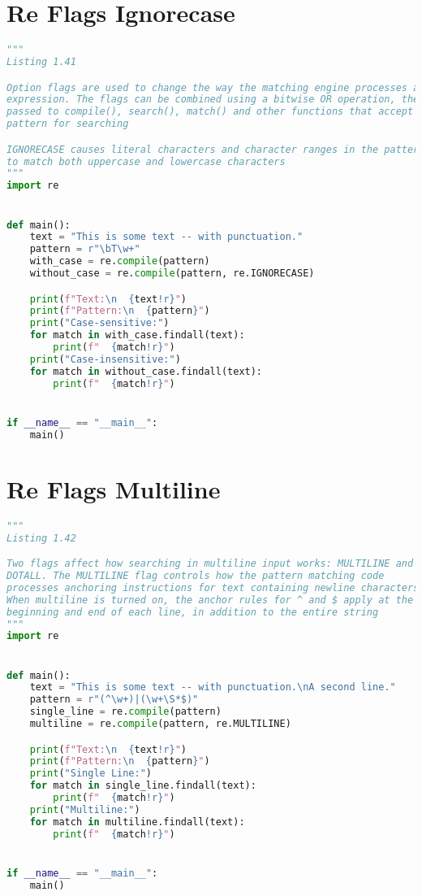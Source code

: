 \documentclass[a4paper,landscape]{report}
\begin{document}
\section{Re Flags Ignorecase}
\begin{lstlisting}[language=Python]
"""
Listing 1.41

Option flags are used to change the way the matching engine processes an
expression. The flags can be combined using a bitwise OR operation, then
passed to compile(), search(), match() and other functions that accept a
pattern for searching

IGNORECASE causes literal characters and character ranges in the pattern
to match both uppercase and lowercase characters
"""
import re


def main():
    text = "This is some text -- with punctuation."
    pattern = r"\bT\w+"
    with_case = re.compile(pattern)
    without_case = re.compile(pattern, re.IGNORECASE)

    print(f"Text:\n  {text!r}")
    print(f"Pattern:\n  {pattern}")
    print("Case-sensitive:")
    for match in with_case.findall(text):
        print(f"  {match!r}")
    print("Case-insensitive:")
    for match in without_case.findall(text):
        print(f"  {match!r}")


if __name__ == "__main__":
    main()

\end{lstlisting}
\section{Re Flags Multiline}
\begin{lstlisting}[language=Python]
"""
Listing 1.42

Two flags affect how searching in multiline input works: MULTILINE and
DOTALL. The MULTILINE flag controls how the pattern matching code
processes anchoring instructions for text containing newline characters.
When multiline is turned on, the anchor rules for ^ and $ apply at the
beginning and end of each line, in addition to the entire string
"""
import re


def main():
    text = "This is some text -- with punctuation.\nA second line."
    pattern = r"(^\w+)|(\w+\S*$)"
    single_line = re.compile(pattern)
    multiline = re.compile(pattern, re.MULTILINE)

    print(f"Text:\n  {text!r}")
    print(f"Pattern:\n  {pattern}")
    print("Single Line:")
    for match in single_line.findall(text):
        print(f"  {match!r}")
    print("Multiline:")
    for match in multiline.findall(text):
        print(f"  {match!r}")


if __name__ == "__main__":
    main()

\end{lstlisting}
\end{document}
